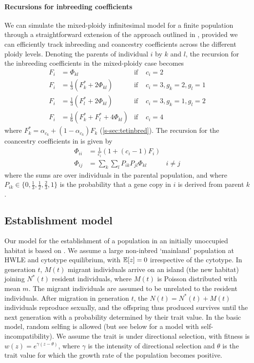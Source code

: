 \documentclass[11pt,a4paper]{article}
\begin{document}
\paragraph{Recursions for inbreeding coefficients}

We can simulate the mixed-ploidy infinitesimal model for a finite population
through a straightforward extension of the approach outlined in
\cite{barton2017}, provided we can efficiently track inbreeding and coancestry
coefficients across the different ploidy levels.
Denoting the parents of individual $i$ by $k$ and $l$, the recursion for the
inbreeding coefficients in the mixed-ploidy case becomes
\begin{align}
    F_i &= \Phi_{kl} & \text{if } & c_i = 2 \nonumber \\ 
    F_i &= \frac{1}{3}\left(F_k^\ast + 2\Phi_{kl}\right) & \text{if } 
        & c_i = 3, g_k = 2, g_l = 1 \nonumber \\ 
    F_i &= \frac{1}{3}\left(F_l^\ast + 2\Phi_{kl}\right) & \text{if } 
        & c_i = 3, g_k = 1, g_l = 2 \nonumber \\ 
    F_i &= \frac1 6 (F_k^\ast + F_l^\ast + 4\Phi_{kl}) & \text{if } & c_i = 4
\end{align}
where $F_k^\ast = \alpha_{c_k} + (1-\alpha_{c_k})F_k$ (\cref{s-sec:tetinbred}).
The recursion for the coancestry coefficients in is given by
\begin{align}
    \Phi_{ii} &= \frac{1}{c_{i}} \left(1 + (c_i-1)F_i\right) \nonumber \\
    \Phi_{ij} &= \sum_k \sum_l P_{ik}P_{jl} \Phi_{kl} & i \ne j 
    \label{eq:coancestry}
\end{align}
where the sums are over individuals in the parental population, and where
$P_{ik} \in \{0, \frac1 3, \frac1 2, \frac2 3, 1\}$ is the probability that a
gene copy in $i$ is derived from parent $k$.

\subsection*{Establishment model}

Our model for the establishment of a population in an initially unoccupied
habitat is based on \cite{barton2018}.
We assume a large non-inbred `mainland' population at HWLE and cytotype
equilibrium, with $\mathbb{E}[z] = 0$ irrespective of the cytotype.
In generation $t$, $M(t)$ migrant individuals arrive on an island (the new
habitat) joining $N^\ast(t)$ resident individuals, where $M(t)$ is Poisson
distributed with mean $m$. 
The migrant individuals are assumed to be unrelated to the resident
individuals.
After migration in generation $t$, the $N(t) = N^\ast(t) + M(t)$ individuals
reproduce sexually, and the offspring thus produced survives until the next
generation with a probability determined by their trait value.
In the basic model, random selfing is allowed (but see below for a model with
self-incompatibility).
We assume the trait is under directional selection, with fitness is $w(z) =
e^{\gamma(z - \theta)}$, where $\gamma$ is the intensity of directional
selection and $\theta$ is the trait value for which the growth rate of the
population becomes positive.
\end{document}
